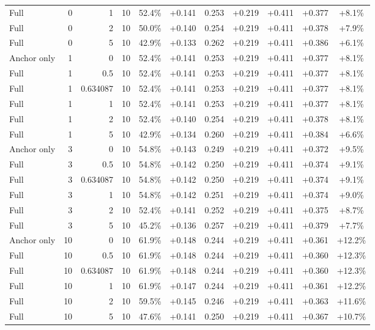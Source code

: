 \begin{table}[htbp]
\begin{tabular}{lrrrccccccc}
Full & 0 & 1 & 10 & 52.4\% & +0.141 & 0.253 & +0.219 & +0.411 & +0.377 & +8.1\% \\
Full & 0 & 2 & 10 & 50.0\% & +0.140 & 0.254 & +0.219 & +0.411 & +0.378 & +7.9\% \\
Full & 0 & 5 & 10 & 42.9\% & +0.133 & 0.262 & +0.219 & +0.411 & +0.386 & +6.1\% \\
Anchor only & 1 & 0 & 10 & 52.4\% & +0.141 & 0.253 & +0.219 & +0.411 & +0.377 & +8.1\% \\
Full & 1 & 0.5 & 10 & 52.4\% & +0.141 & 0.253 & +0.219 & +0.411 & +0.377 & +8.1\% \\
Full & 1 & 0.634087 & 10 & 52.4\% & +0.141 & 0.253 & +0.219 & +0.411 & +0.377 & +8.1\% \\
Full & 1 & 1 & 10 & 52.4\% & +0.141 & 0.253 & +0.219 & +0.411 & +0.377 & +8.1\% \\
Full & 1 & 2 & 10 & 52.4\% & +0.140 & 0.254 & +0.219 & +0.411 & +0.378 & +8.1\% \\
Full & 1 & 5 & 10 & 42.9\% & +0.134 & 0.260 & +0.219 & +0.411 & +0.384 & +6.6\% \\
Anchor only & 3 & 0 & 10 & 54.8\% & +0.143 & 0.249 & +0.219 & +0.411 & +0.372 & +9.5\% \\
Full & 3 & 0.5 & 10 & 54.8\% & +0.142 & 0.250 & +0.219 & +0.411 & +0.374 & +9.1\% \\
Full & 3 & 0.634087 & 10 & 54.8\% & +0.142 & 0.250 & +0.219 & +0.411 & +0.374 & +9.1\% \\
Full & 3 & 1 & 10 & 54.8\% & +0.142 & 0.251 & +0.219 & +0.411 & +0.374 & +9.0\% \\
Full & 3 & 2 & 10 & 52.4\% & +0.141 & 0.252 & +0.219 & +0.411 & +0.375 & +8.7\% \\
Full & 3 & 5 & 10 & 45.2\% & +0.136 & 0.257 & +0.219 & +0.411 & +0.379 & +7.7\% \\
Anchor only & 10 & 0 & 10 & 61.9\% & +0.148 & 0.244 & +0.219 & +0.411 & +0.361 & +12.2\% \\
Full & 10 & 0.5 & 10 & 61.9\% & +0.148 & 0.244 & +0.219 & +0.411 & +0.360 & +12.3\% \\
Full & 10 & 0.634087 & 10 & 61.9\% & +0.148 & 0.244 & +0.219 & +0.411 & +0.360 & +12.3\% \\
Full & 10 & 1 & 10 & 61.9\% & +0.147 & 0.244 & +0.219 & +0.411 & +0.361 & +12.2\% \\
Full & 10 & 2 & 10 & 59.5\% & +0.145 & 0.246 & +0.219 & +0.411 & +0.363 & +11.6\% \\
Full & 10 & 5 & 10 & 47.6\% & +0.141 & 0.250 & +0.219 & +0.411 & +0.367 & +10.7\% \\

\end{tabular}
\end{table}
